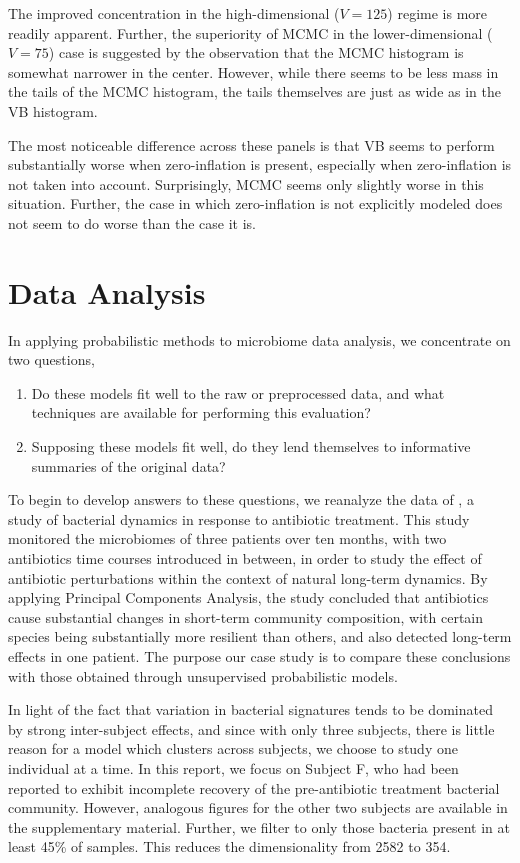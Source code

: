 \documentclass[oupdraft]{bio}
\begin{document}
The improved concentration in the high-dimensional ($V = 125$) regime is
more readily apparent. Further, the superiority of MCMC in the
lower-dimensional ($V = 75$) case is suggested by the observation that the MCMC
histogram is somewhat narrower in the center. However, while there seems to be
less mass in the tails of the MCMC histogram, the tails themselves are just as
wide as in the VB histogram.

The most noticeable difference across these panels is that VB
seems to perform substantially worse when zero-inflation is present, especially
when zero-inflation is not taken into account. Surprisingly, MCMC
seems only slightly worse in this situation. Further, the case in which
zero-inflation is not explicitly modeled does not seem to do worse than the case
it is.

\section{Data Analysis}

In applying probabilistic methods to microbiome data analysis, we concentrate on
two questions,
\begin{enumerate}
\item Do these models fit well to the raw or preprocessed data, and what techniques
are available for performing this evaluation?
\item Supposing these models fit well, do they lend themselves to informative
summaries of the original data?
\end{enumerate}

To begin to develop answers to these questions, we reanalyze the data of
\citep{dethlefsen2011incomplete}, a study of bacterial dynamics in response to
antibiotic treatment. This study monitored the microbiomes of three patients
over ten months, with two antibiotics time courses introduced in between, in
order to study the effect of antibiotic perturbations within the context of
natural long-term dynamics. By applying Principal Components Analysis, the study
concluded that antibiotics cause substantial changes in short-term community
composition, with certain species being substantially more resilient than
others, and also detected long-term effects in one patient. The purpose our case
study is to compare these conclusions with those obtained through unsupervised
probabilistic models.

In light of the fact that variation in bacterial signatures tends to be
dominated by strong inter-subject effects, and since with only three subjects,
there is little reason for a model which clusters across subjects, we choose to
study one individual at a time. In this report, we focus on Subject F, who had
been reported to exhibit incomplete recovery of the pre-antibiotic treatment
bacterial community. However, analogous figures for the other two subjects are
available in the supplementary material. Further, we filter to only those
bacteria present in at least 45\% of samples. This reduces the dimensionality
from 2582 to 354.
\end{document}
